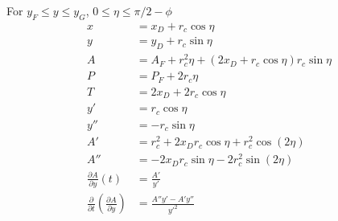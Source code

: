 








For $y_F \le y \le y_G$, $0 \le \eta \le  \pi/2-\phi$
\begin{equation}
\begin{aligned}
x & = x_D + r_c \cos\eta \\
y & = y_D + r_c \sin \eta \\
A & = A_F + r_c^2 \eta + (2x_D + r_c\cos\eta)r_c\sin\eta  \\
P & = P_F + 2 r_c \eta \\
T & = 2 x_D + 2 r_c \cos\eta \\
y' & = r_c \cos \eta \\
y'' & = -r_c \sin \eta \\
A' & = r_c^2 + 2x_D r_c\cos\eta + r_c^2 \cos(2\eta)  \\
A'' & = -2x_D r_c\sin\eta - 2 r_c^2 \sin(2\eta)  \\
\frac{\partial A}{\partial y}(t) &= \frac{A'}{y'} \\
\frac{\partial}{\partial t}\left( \frac{\partial A}{\partial y}\right) &= \frac{A''y' - A'y''}{y'^2} \\
\end{aligned}
\end{equation}


